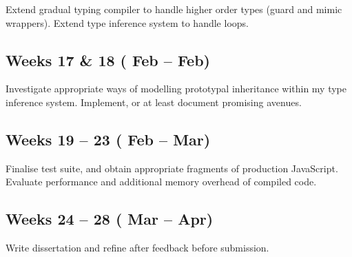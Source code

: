 \documentclass{article}
\begin{document}
		Extend gradual typing compiler to handle higher order types (guard and
		mimic wrappers). Extend type inference system to handle loops.

		\subsection*{Weeks 17 \& 18 ( Feb --  Feb)}

		Investigate appropriate ways of modelling prototypal inheritance
		within my type inference system. Implement, or at least document
		promising avenues.

		\subsection*{Weeks 19 -- 23 ( Feb --  Mar)}

		Finalise test suite, and obtain appropriate fragments of production
		JavaScript. Evaluate performance and additional memory overhead of
		compiled code.
		
		\subsection*{Weeks 24 -- 28 ( Mar --  Apr)}

		Write dissertation and refine after feedback before submission.
\end{document}

